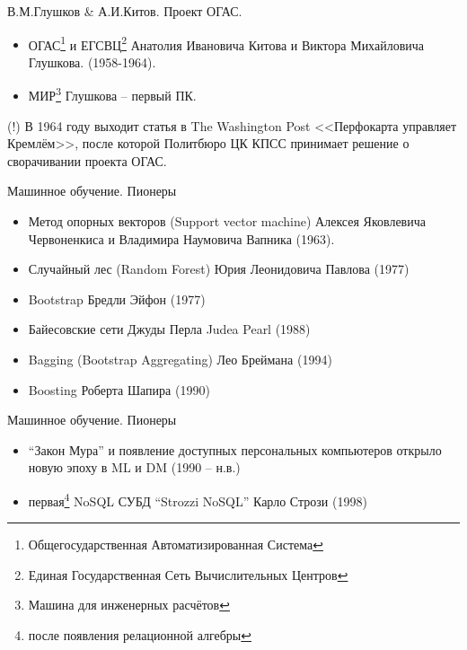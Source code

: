    \begin{frame}{В.М.Глушков \& А.И.Китов. Проект ОГАС.}
	  \begin{itemize}
	  	\item ОГАС\footnote{Общегосударственная Автоматизированная Система}
	  	и ЕГСВЦ\footnote{Единая Государственная Сеть Вычислительных Центров}
	  	Анатолия Ивановича Китова
	  	и
	  	Виктора Михайловича Глушкова.
	  	(1958-1964).
	  	\item МИР\footnote{Машина для инженерных расчётов} Глушкова -- первый ПК.
	  \end{itemize}
     (!) В 1964 году выходит статья в The Washington Post <<Перфокарта управляет Кремлём>>,
     после которой Политбюро ЦК КПСС принимает решение о сворачивании проекта ОГАС. 
     
	\end{frame}
  
  \begin{frame}{Машинное обучение. Пионеры}
    \begin{itemize}
  	  \item Метод опорных векторов
  	  (Support vector machine)
  	  Алексея Яковлевича Червоненкиса
  	  и
  	  Владимира Наумовича Вапника (1963). 
  	  \item Случайный лес
  	  (Random Forest)
  	  Юрия Леонидовича Павлова (1977)
  	  \item Bootstrap 
  	  Бредли Эйфон (1977)
  	  \item Байесовские сети
  	  Джуды Перла
  	  Judea Pearl
  	  (1988)
  	  \item Bagging
  	  (Bootstrap Aggregating)
  	  Лео Бреймана
  	  (1994)
  	  \item Boosting
  	  Роберта Шапира 
  	  (1990)
    \end{itemize}
  \end{frame}

 
 
 \begin{frame}{Машинное обучение. Пионеры}
 \begin{itemize}
 	\item “Закон Мура” и появление
 	доступных
 	персональных компьютеров
 	открыло новую эпоху в ML и DM  
 	(1990 – н.в.)
 	\item первая\footnote{после появления релационной алгебры}
 	NoSQL СУБД
 	“Strozzi NoSQL”
 	Карло Стрози
 	(1998) 
 \end{itemize}
\end{frame}

